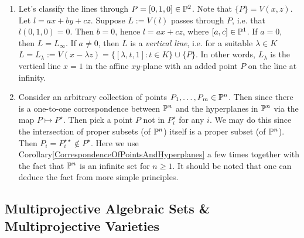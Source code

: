     \begin{example}\label{LinesNotPassingThroughPoints}
        \begin{enumerate}
            \item Let's classify the lines through $P=[0,1,0]\in \mathbb{P}^2$. Note that $\{P\}=V(x,z)$. Let $l=ax+by+cz$. Suppose $L:=V(l)$ passes through $P$, i.e. that $l(0,1,0)=0$. Then $b=0$, hence $l = ax+cz$, where $[a,c]\in \mathbb{P}^1$. If $a=0$, then $L=L_\infty$. If $a\neq 0$, then $L$ is a \textit{vertical line}, i.e. for a suitable $\lambda\in K$
            $L=L_\lambda := V(x-\lambda z)=\{ [\lambda,t,1] : t\in K\} \cup \{P\}.$
            In other words, $L_\lambda$ is the vertical line $x=1$ in the affine $xy$-plane with an added point $P$ on the line at infinity.
            \item Consider an arbitrary collection of points $P_1,\dots,P_m\in \mathbb{P}^n$. Then since there is a one-to-one correspondence between $\mathbb{P}^n$ and the hyperplanes in $\mathbb{P}^n$ via the map $P\mapsto P^\star$. Then pick a point $P$ not in $P_i^\star$ for any $i$. We may do this since the intersection of proper subsets (of $\mathbb{P}^n$) itself is a proper subset (of $\mathbb{P}^n$). Then $P_i=P_i^{\star\star}\notin P^\star$. Here we use Corollary\ref{CorrespondenceOfPointsAndHyperplanes} a few times together with the fact that $\mathbb{P}^n$ is an infinite set for $n\geq 1$. It should be noted that one can deduce the fact from more simple principles.  
        \end{enumerate} 
    \end{example}
\subsection{Multiprojective Algebraic Sets \& Multiprojective Varieties}
